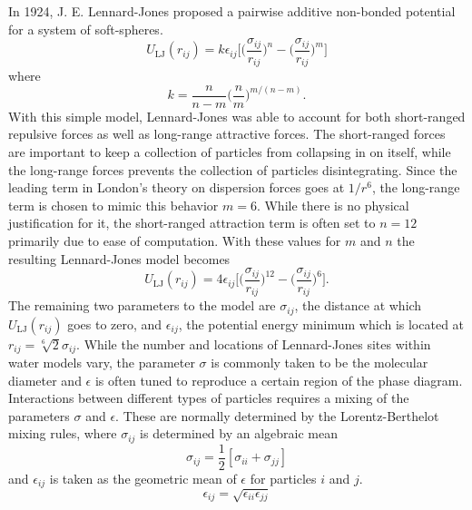 In 1924, J. E. Lennard-Jones proposed a pairwise additive
non-bonded potential for a system of soft-spheres.
\begin{equation}\label{eq:LJ}
U_{\mathrm{LJ}}(r_{ij}) = k\epsilon_{ij}\Bigg[ \Big( \frac{\sigma_{ij}}{r_{ij}}\Big)^n - \Big(\frac{\sigma_{ij}}{r_{ij}}\Big)^m\Bigg]
\end{equation}
where
\begin{equation}\label{eq:LJ2}
k = \frac{n}{n-m} \Big(\frac{n}{m}\Big)^{m/(n-m)}.
\end{equation}
With this simple model, Lennard-Jones was able to account for both
short-ranged repulsive forces as well as long-range attractive
forces. The short-ranged forces are important to keep a collection of
particles from collapsing in on itself, while the long-range forces
prevents the collection of particles disintegrating. Since the leading
term in London's theory on dispersion forces goes at $1/r^6$, the
long-range term is chosen to mimic this behavior $m=6$. While there is
no physical justification for it, the short-ranged attraction term is
often set to $n=12$ primarily due to ease of computation. With these
values for $m$ and $n$ the resulting Lennard-Jones model becomes
\begin{equation}\label{eq:LJ3}
U_{\mathrm{LJ}}(r_{ij}) =
4\epsilon_{ij}\Bigg[\Big(\frac{\sigma_{ij}}{r_{ij}}\Big)^{12}-\Big(\frac{\sigma_{ij}}{r_{ij}}\Big)^{6}\Bigg].
\end{equation} 
The remaining two parameters to the model are $\sigma_{ij}$, the distance
at which $U_{\mathrm{LJ}}(r_{ij})$ goes to zero, and $\epsilon_{ij}$, the potential
energy minimum which is located at $r_{ij} = \sqrt[6]{2}\sigma_{ij}$. While the
number and locations of Lennard-Jones sites within water models vary,
the parameter $\sigma$ is commonly taken to be the molecular diameter
and $\epsilon$ is often tuned to reproduce a certain region of the
phase diagram. Interactions between different types of particles
requires a mixing of the parameters $\sigma$ and $\epsilon$. These are
normally determined by the Lorentz-Berthelot mixing rules, where
$\sigma_{ij}$ is determined by an algebraic mean 
\begin{equation}\label{eq:sigma}
\sigma_{ij} = \frac{1}{2} [\sigma_{ii} + \sigma_{jj}]
\end{equation}
and $\epsilon_{ij}$ is taken as the geometric mean of $\epsilon$ for
particles $i$ and $j$. \cite{paper}
\begin{equation}\label{eq:epsilon}
\epsilon_{ij} = \sqrt{\epsilon_{ii}\epsilon_{jj}}
\end{equation}


